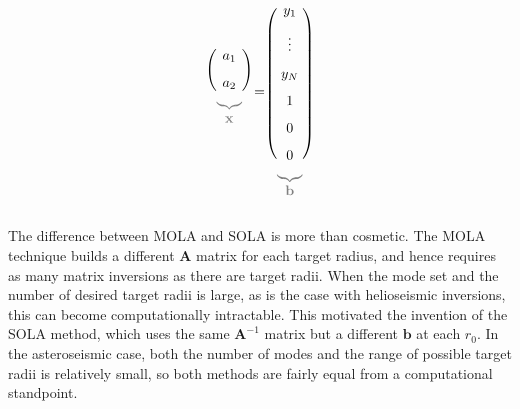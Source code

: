 \documentclass[twocolumn,twocolappendix]{aastex6}
\begin{document}
\begin{figure*}
\begin{equation}
\begin{blockarray}{c}
\begin{block}{(c)}
                a_1 \\[0.75em]
                a_2 \\%
            \end{block}\\[-5mm]
            {\color{gray} \underbrace{ }_{\textstyle \mathbf{\vphantom{A}x\vphantom{b}}}} \\
        \end{blockarray} = 
        \begin{blockarray}{c}
            \\[0.75em]
            \begin{block}{(c)}
                y_1 \\[0.75em]
                \vdots \\[0.75em]
                y_N \\[0.75em]
                1 \\[0.75em]
                0 \\[0.75em]
                0 \\%
            \end{block}\\[-5mm]
            {\color{gray} \underbrace{ }_{\textstyle \mathbf{\vphantom{A}b\vphantom{x}}}} \\
        \end{blockarray} 
    \end{equation}
\end{figure*}

The difference between MOLA and SOLA is more than cosmetic. The MOLA technique builds a different $\mathbf{A}$ matrix for each target radius, and hence requires as many matrix inversions as there are target radii. When the mode set and the number of desired target radii is large, as is the case with helioseismic inversions, this can become computationally intractable. This motivated the invention of the SOLA method, which uses the same $\mathbf{A}^{-1}$ matrix but a different $\mathbf{b}$ at each $r_0$. In the asteroseismic case, both the number of modes and the range of possible target radii is relatively small, so both methods are fairly equal from a computational standpoint. 



\clearpage


\end{document}
